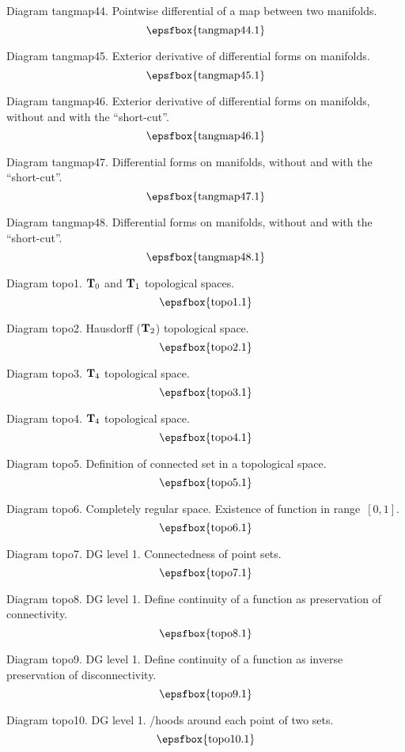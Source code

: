 Diagram tangmap44. Pointwise differential of a map between two manifolds.
$$
\centerline{\epsfbox{tangmap44.1}}
$$

Diagram tangmap45. Exterior derivative of differential forms on manifolds.
$$
\centerline{\epsfbox{tangmap45.1}}
$$

Diagram tangmap46. Exterior derivative of differential forms on manifolds,
without and with the ``short-cut''.
$$
\centerline{\epsfbox{tangmap46.1}}
$$

\filleject

Diagram tangmap47. Differential forms on manifolds, without and with the
``short-cut''.
$$
\centerline{\epsfbox{tangmap47.1}}
$$

Diagram tangmap48. Differential forms on manifolds, without and with the
``short-cut''.
$$
\centerline{\epsfbox{tangmap48.1}}
$$

\secteject
\edef\SECTtopo{\the\pageno}

Diagram topo1. ${\bf T}_0$ and ${\bf T}_1$ topological spaces.
$$
\centerline{\epsfbox{topo1.1}}
$$

Diagram topo2. Hausdorff (${\bf T}_2$) topological space.
$$
\centerline{\epsfbox{topo2.1}}
$$

Diagram topo3. ${\bf T}_4$ topological space.
$$
\centerline{\epsfbox{topo3.1}}
$$

Diagram topo4. ${\bf T}_4$ topological space.
$$
\centerline{\epsfbox{topo4.1}}
$$

Diagram topo5. Definition of connected set in a topological space.
$$
\centerline{\epsfbox{topo5.1}}
$$

Diagram topo6. Completely regular space. Existence of function in range~$[0,1]$.
$$
\centerline{\epsfbox{topo6.1}}
$$

\filleject

Diagram topo7. DG level 1. Connectedness of point sets.
$$
\centerline{\epsfbox{topo7.1}}
$$

Diagram topo8. DG level 1. Define continuity of a function as preservation of
connectivity.
$$
\centerline{\epsfbox{topo8.1}}
$$

Diagram topo9. DG level 1. Define continuity of a function as inverse
preservation of disconnectivity.
$$
\centerline{\epsfbox{topo9.1}}
$$

Diagram topo10. DG level 1. \Neighbour/hoods around each point of two sets.
$$
\centerline{\epsfbox{topo10.1}}
$$

